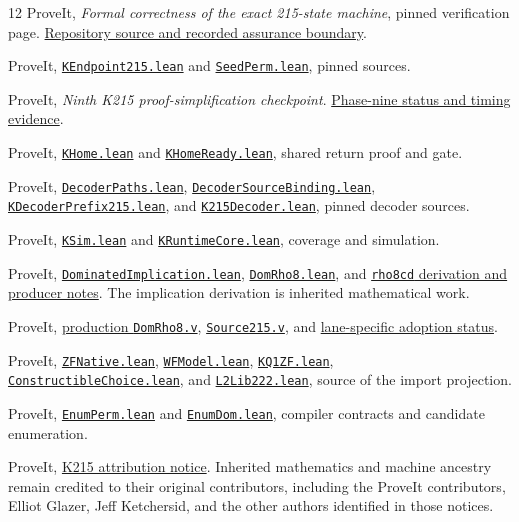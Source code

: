 \documentclass[11pt,letterpaper]{article}
\newcommand{\code}[1]{\texttt{\small #1}}
\newcommand{\repo}{https://github.com/VladimirReshetnikov/ProveIt/blob/2ca3a5c16f0876d2cab842056353c03a1ed2f5f0}
\newcommand{\leanbase}{\repo/Computability/BusyBeaver/Lean/BusyBeaver/ZFC}
\newcommand{\formalbase}{\repo/Computability/BusyBeaver/Research/ZFC/k225-formal}
\begin{document}
\begin{thebibliography}{12}
\small
{}
ProveIt, \emph{Formal correctness of the exact 215-state machine}, pinned verification page.
\href{\formalbase/verification/k215/README.md}{Repository source and recorded assurance boundary}.

ProveIt, \href{\leanbase/KEndpoint215.lean}{\code{KEndpoint215.lean}} and
\href{\leanbase/SeedPerm.lean}{\code{SeedPerm.lean}}, pinned sources.

ProveIt, \emph{Ninth K215 proof-simplification checkpoint}.
\href{\formalbase/verification/k215/simplification/phase9/README.md}{Phase-nine status and timing evidence}.

ProveIt, \href{\leanbase/KHome.lean}{\code{KHome.lean}} and
\href{\leanbase/KHomeReady.lean}{\code{KHomeReady.lean}}, shared return proof and gate.

ProveIt, \href{\leanbase/DecoderPaths.lean}{\code{DecoderPaths.lean}},
\href{\leanbase/DecoderSourceBinding.lean}{\code{DecoderSourceBinding.lean}},
\href{\leanbase/KDecoderPrefix215.lean}{\code{KDecoderPrefix215.lean}}, and
\href{\leanbase/K215Decoder.lean}{\code{K215Decoder.lean}}, pinned decoder sources.

ProveIt, \href{\leanbase/KSim.lean}{\code{KSim.lean}} and
\href{\leanbase/KRuntimeCore.lean}{\code{KRuntimeCore.lean}}, coverage and simulation.

ProveIt, \href{\leanbase/DominatedImplication.lean}{\code{DominatedImplication.lean}},
\href{\leanbase/DomRho8.lean}{\code{DomRho8.lean}}, and
\href{\formalbase/rho8cd/README.md}{\code{rho8cd} derivation and producer notes}.
The implication derivation is inherited mathematical work.

ProveIt, \href{\formalbase/rocq/rocq-extension/coq/215/DomRho8.v}{production \code{DomRho8.v}},
\href{\formalbase/rocq/rocq-extension/coq/215/Source215.v}{\code{Source215.v}}, and
\href{\formalbase/rho8cd/PROVEIT_STATUS.md}{lane-specific adoption status}.

ProveIt, \href{\leanbase/ZFNative.lean}{\code{ZFNative.lean}},
\href{\leanbase/WFModel.lean}{\code{WFModel.lean}},
\href{\leanbase/KQ1ZF.lean}{\code{KQ1ZF.lean}},
\href{\leanbase/ConstructibleChoice.lean}{\code{ConstructibleChoice.lean}}, and
\href{\leanbase/L2Lib222.lean}{\code{L2Lib222.lean}}, source of the import projection.

ProveIt, \href{\leanbase/EnumPerm.lean}{\code{EnumPerm.lean}} and
\href{\leanbase/EnumDom.lean}{\code{EnumDom.lean}}, compiler contracts and candidate enumeration.

ProveIt, \href{\repo/Computability/BusyBeaver/Research/ZFC/candidate-k215/NOTICE.md}{K215 attribution notice}.
Inherited mathematics and machine ancestry remain credited to their original contributors,
including the ProveIt contributors, Elliot Glazer, Jeff Ketchersid, and the other authors
identified in those notices.
\end{thebibliography}
\end{document}
